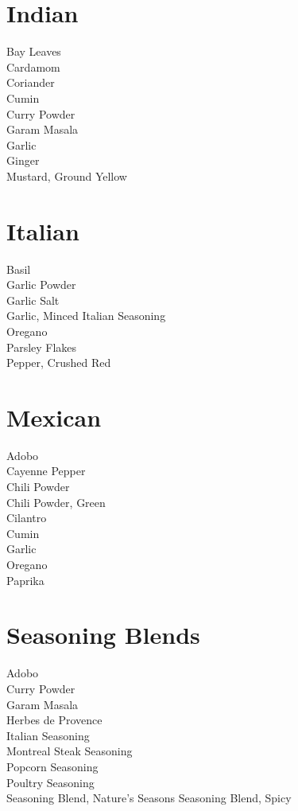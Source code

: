 \documentclass[twocolumn]{article}
\begin{document}
\section*{Indian}
Bay Leaves\\
Cardamom\\
Coriander\\
Cumin\\
Curry Powder\\
Garam Masala\\
Garlic\\
Ginger\\
Mustard, Ground Yellow\\

\section*{Italian}
Basil\\
Garlic Powder\\
Garlic Salt\\
Garlic, Minced
Italian Seasoning\\
Oregano\\
Parsley Flakes\\
Pepper, Crushed Red\\

\section*{Mexican}
Adobo\\
Cayenne Pepper\\
Chili Powder\\
Chili Powder, Green\\
Cilantro\\
Cumin\\
Garlic\\
Oregano\\
Paprika\\

\section*{Seasoning Blends}
Adobo\\
Curry Powder\\
Garam Masala\\
Herbes de Provence\\
Italian Seasoning\\
Montreal Steak Seasoning\\
Popcorn Seasoning\\
Poultry Seasoning\\
Seasoning Blend, Nature's Seasons
Seasoning Blend, Spicy
\end{document}
